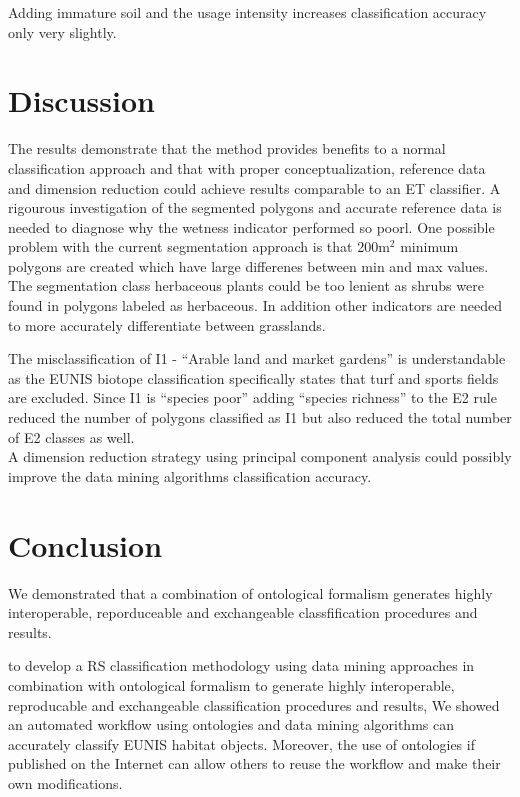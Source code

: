 \documentclass[authoryear, review,12pt,number]{elsarticle}
\begin{document}
{Adding immature soil and the usage intensity increases classification accuracy 
only very slightly.

\section{Discussion}
The results demonstrate that the method provides benefits to a normal
classification approach and that with proper conceptualization, reference data
and dimension reduction could achieve results comparable to an ET classifier. A
rigourous investigation of the segmented polygons and accurate reference data is
needed to diagnose why the wetness indicator performed so poorl. One possible
problem with the current segmentation approach is that 200m$^{2}$ minimum
polygons are created which have large differenes between min and max values. The
segmentation class herbaceous plants could be too lenient as shrubs were found
in polygons labeled as herbaceous. In addition other indicators are needed to
more accurately differentiate between grasslands.

The misclassification of I1 - ``Arable land and market gardens'' is 
understandable as the EUNIS biotope classification specifically states that 
turf and sports fields are excluded. Since I1 is ``species poor'' adding 
``species richness'' to the E2 rule reduced the number of polygons classified 
as I1 but also reduced the total number of E2 classes as well.\\

A dimension reduction strategy using principal component analysis could possibly
improve the data mining algorithms classification accuracy.
\section{Conclusion}
We demonstrated that a combination of ontological formalism generates highly
interoperable, reporduceable and exchangeable classfification procedures and
results.

 to develop a RS classification methodology using data mining approaches
     in combination with ontological formalism to generate highly interoperable,
     reproducable and exchangeable classification procedures and results,
We showed an automated workflow using ontologies and data mining algorithms can 
accurately classify EUNIS habitat objects. Moreover, the use of ontologies if 
published on the Internet can allow others to reuse the workflow and make their 
own modifications. 
}
\end{document}
